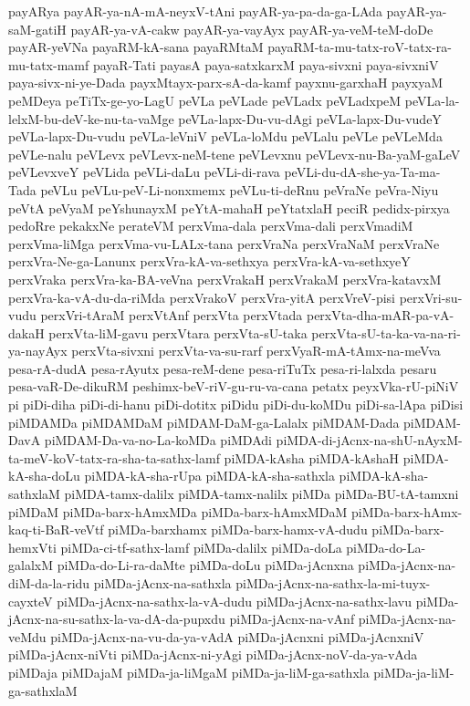 {payARya
payAR-ya-nA-mA-neyxV-tAni
payAR-ya-pa-da-ga-LAda
payAR-ya-saM-gatiH
payAR-ya-vA-cakw
payAR-ya-vayAyx
payAR-ya-veM-teM-doDe
payAR-yeVNa
payaRM-kA-sana
payaRMtaM
payaRM-ta-mu-tatx-roV-tatx-ra-mu-tatx-mamf
payaR-Tati
payasA
paya-satxkarxM
paya-sivxni
paya-sivxniV
paya-sivx-ni-ye-Dada
payxMtayx-parx-sA-da-kamf
payxnu-garxhaH
payxyaM
peMDeya
peTiTx-ge-yo-LagU
peVLa
peVLade
peVLadx
peVLadxpeM
peVLa-la-lelxM-bu-deV-ke-nu-ta-vaMge
peVLa-lapx-Du-vu-dAgi
peVLa-lapx-Du-vudeY
peVLa-lapx-Du-vudu
peVLa-leVniV
peVLa-loMdu
peVLalu
peVLe
peVLeMda
peVLe-nalu
peVLevx
peVLevx-neM-tene
peVLevxnu
peVLevx-nu-Ba-yaM-gaLeV
peVLevxveY
peVLida
peVLi-daLu
peVLi-di-rava
peVLi-du-dA-she-ya-Ta-ma-Tada
peVLu
peVLu-peV-Li-nonxmemx
peVLu-ti-deRnu
peVraNe
peVra-Niyu
peVtA
peVyaM
peYshunayxM
peYtA-mahaH
peYtatxlaH
peciR
pedidx-pirxya
pedoRre
pekakxNe
perateVM
perxVma-dala
perxVma-dali
perxVmadiM
perxVma-liMga
perxVma-vu-LALx-tana
perxVraNa
perxVraNaM
perxVraNe
perxVra-Ne-ga-Lanunx
perxVra-kA-va-sethxya
perxVra-kA-va-sethxyeY
perxVraka
perxVra-ka-BA-veVna
perxVrakaH
perxVrakaM
perxVra-katavxM
perxVra-ka-vA-du-da-riMda
perxVrakoV
perxVra-yitA
perxVreV-pisi
perxVri-su-vudu
perxVri-tAraM
perxVtAnf
perxVta
perxVtada
perxVta-dha-mAR-pa-vA-dakaH
perxVta-liM-gavu
perxVtara
perxVta-sU-taka
perxVta-sU-ta-ka-va-na-ri-ya-nayAyx
perxVta-sivxni
perxVta-va-su-rarf
perxVyaR-mA-tAmx-na-meVva
pesa-rA-dudA
pesa-rAyutx
pesa-reM-dene
pesa-riTuTx
pesa-ri-lalxda
pesaru
pesa-vaR-De-dikuRM
peshimx-beV-riV-gu-ru-va-cana
petatx
peyxVka-rU-piNiV
pi
piDi-diha
piDi-di-hanu
piDi-dotitx
piDidu
piDi-du-koMDu
piDi-sa-lApa
piDisi
piMDAMDa
piMDAMDaM
piMDAM-DaM-ga-Lalalx
piMDAM-Dada
piMDAM-DavA
piMDAM-Da-va-no-La-koMDa
piMDAdi
piMDA-di-jAcnx-na-shU-nAyxM-ta-meV-koV-tatx-ra-sha-ta-sathx-lamf
piMDA-kAsha
piMDA-kAshaH
piMDA-kA-sha-doLu
piMDA-kA-sha-rUpa
piMDA-kA-sha-sathxla
piMDA-kA-sha-sathxlaM
piMDA-tamx-dalilx
piMDA-tamx-nalilx
piMDa
piMDa-BU-tA-tamxni
piMDaM
piMDa-barx-hAmxMDa
piMDa-barx-hAmxMDaM
piMDa-barx-hAmx-kaq-ti-BaR-veVtf
piMDa-barxhamx
piMDa-barx-hamx-vA-dudu
piMDa-barx-hemxVti
piMDa-ci-tf-sathx-lamf
piMDa-dalilx
piMDa-doLa
piMDa-do-La-galalxM
piMDa-do-Li-ra-daMte
piMDa-doLu
piMDa-jAcnxna
piMDa-jAcnx-na-diM-da-la-ridu
piMDa-jAcnx-na-sathxla
piMDa-jAcnx-na-sathx-la-mi-tuyx-cayxteV
piMDa-jAcnx-na-sathx-la-vA-dudu
piMDa-jAcnx-na-sathx-lavu
piMDa-jAcnx-na-su-sathx-la-va-dA-da-pupxdu
piMDa-jAcnx-na-vAnf
piMDa-jAcnx-na-veMdu
piMDa-jAcnx-na-vu-da-ya-vAdA
piMDa-jAcnxni
piMDa-jAcnxniV
piMDa-jAcnx-niVti
piMDa-jAcnx-ni-yAgi
piMDa-jAcnx-noV-da-ya-vAda
piMDaja
piMDajaM
piMDa-ja-liMgaM
piMDa-ja-liM-ga-sathxla
piMDa-ja-liM-ga-sathxlaM
}

